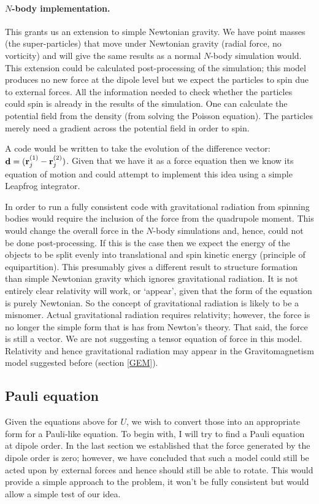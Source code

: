 \paragraph{$N$-body implementation.}
This grants us an extension to simple Newtonian gravity. We have point masses (the super-particles) that move under Newtonian gravity (radial force, no vorticity) and will give the same results as a normal $N$-body simulation would. This extension could be calculated post-processing of the simulation; this model produces no new force at the dipole level but we expect the particles to spin due to external forces. All the information needed to check whether the particles could spin is already in the results of the simulation. One can calculate the potential field from the density (from solving the Poisson equation). The particles merely need a gradient across the potential field in order to spin.

A code would be written to take the evolution of the difference vector: ${\bf d} = ({\bf r}^{(1)}_j - {\bf r}^{(2)}_j)$. Given that we have it as a force equation then we know its equation of motion and could attempt to implement this idea using a simple Leapfrog integrator.

In order to run a fully consistent code with gravitational radiation from spinning bodies would require the inclusion of the force from the quadrupole moment. This would change the overall force in the $N$-body simulations and, hence, could not be done post-processing. If this is the case then we expect the energy of the objects to be split evenly into translational and spin kinetic energy (principle of equipartition). This presumably gives a different result to structure formation than simple Newtonian gravity which ignores gravitational radiation. It is not entirely clear relativity will work, or `appear', given that the form of the equation is purely Newtonian. So the concept of gravitational radiation is likely to be a misnomer. Actual gravitational radiation requires relativity; however, the force is no longer the simple form that is has from Newton's theory. That said, the force is still a vector. We are not suggesting a tensor equation of force in this model. Relativity and hence gravitational radiation may appear in the Gravitomagnetism model suggested before (section \ref{GEM}).


\subsection{Pauli equation}
\label{pauli_d}
Given the equations above for $U$, we wish to convert those into an appropriate form for a Pauli-like equation. To begin with, I will try to find a Pauli equation at dipole order. In the last section we established that the force generated by the dipole order is zero; however, we have concluded that such a model could still be acted upon by external forces and hence should still be able to rotate. This would provide a simple approach to the problem, it won't be fully consistent but would allow a simple test of our idea.

